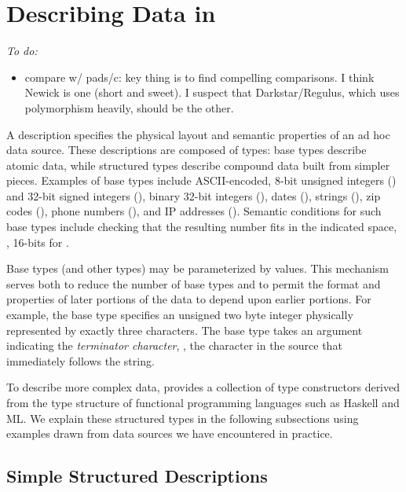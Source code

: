 \newcommand{\pvalue}{???}
\section{Describing Data in \padsmlbig{}}
\label{sec:padsml-overview}

{\em
To do:
\begin{itemize}
\item compare w/ pads/c: key thing is to find compelling
  comparisons. I think Newick is one (short and sweet). I suspect that
  Darkstar/Regulus, which uses polymorphism heavily, should be the other.
\end{itemize}
}

A \padsml{} description specifies the physical layout and semantic
properties of an ad hoc data source.  These descriptions are composed
of types: base types describe atomic data, while structured types
describe compound data built from simpler pieces.  Examples of base
types include ASCII-encoded, 8-bit unsigned integers () and
32-bit signed integers (), binary 32-bit integers (),
dates (), strings (), zip codes (),
phone numbers (), and IP addresses ().  Semantic
conditions for such base types include checking 
that the resulting number fits in the indicated space, \ie, 16-bits
for .

Base types (and other types) may be parameterized by \ml{} values. 
This mechanism serves both to reduce the number of base types
and to permit the format and properties of later portions of the data
to depend upon earlier portions.  For example, the base type
 specifies an unsigned two byte integer physically
represented by exactly three characters. The base type 
takes an argument indicating the \textit{terminator character}, \ie{},
the character in the source that immediately follows the string.

To describe more complex data, \padsml{} provides a collection of
type constructors derived from the type structure of functional
programming languages such as Haskell and ML.  We explain these
structured types in the following subsections using examples drawn
from data sources we have encountered in practice. 


\subsection{Simple Structured Descriptions}


